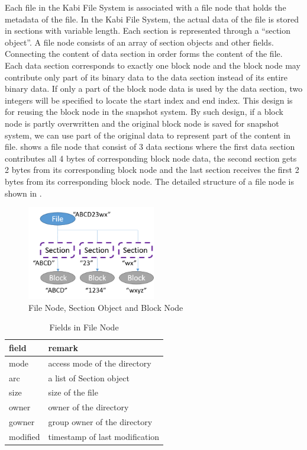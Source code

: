     Each file in the Kabi File System is associated with a file node that holds the metadata of the file. In the Kabi File System, the actual data of the file is stored in sections with variable length. Each section is represented through a ``section object''. A file node consists of an array of section objects and other fields. Connecting the content of data section in order forms the content of the file. Each data section corresponds to exactly one block node and the block node may contribute only part of its binary data to the data section instead of its entire binary data. If only a part of the block node data is used by the data section, two integers will be specified to locate the start index and end index. This design is for reusing the block node in the snapshot system. By such design, if a block node is partly overwritten and the original block node is saved for snapshot system, we can use part of the original data to represent part of the content in file.  shows a file node that consist of 3 data sections where the first data section contributes all 4 bytes of corresponding block node data, the second section gets 2 bytes from its corresponding block node and the last section receives the first 2 bytes from its corresponding block node. The detailed structure of a file node is shown in .

\begin{figure}[t]
\centering
\includegraphics[width=0.5\textwidth]{Chapter-3/figs/fig7.png}
\caption{File Node, Section Object and Block Node}
\label{fig:file_and_section}
\end{figure}


\begin{table}[t]
\begin{center}
\begin{tabular}{ll}
\toprule
field & remark\\
\midrule
mode & access mode of the directory\\
arc & a list of Section object\\
size & size of the file\\
owner & owner of the directory\\
gowner & group owner of the directory\\
modified & timestamp of last modification\\
\bottomrule
\end{tabular}
\end{center}
\caption{Fields in File Node}
\label{tab:file_fields}
\end{table}


